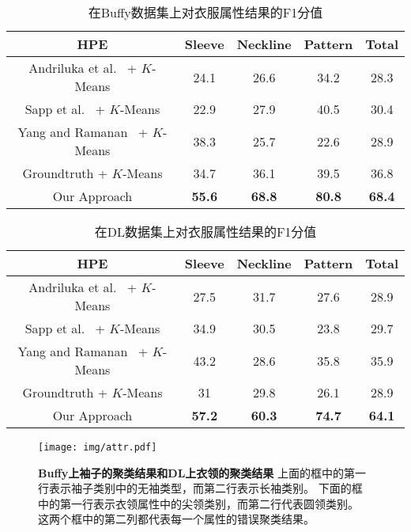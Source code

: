 \begin{table}
\centering
\caption{在Buffy数据集上对衣服属性结果的F1分值}
\begin{tabular}{|c|c|c|c|c|} \hline
    HPE & Sleeve & Neckline & Pattern & Total \\ \hline
Andriluka et al.~\cite{cvpr09} + $K$-Means & 24.1 & 26.6 & 34.2 & 28.3  \\ \hline
Sapp et al.~\cite{eccv10} + $K$-Means & 22.9 & 27.9 & 40.5 & 30.4 \\ \hline
Yang and Ramanan~\cite{deva11} + $K$-Means & 38.3 & 25.7 & 22.6 & 28.9\\ \hline
Groundtruth + $K$-Means & 34.7 & 36.1 & 39.5 & 36.8\\ \hline
Our Approach & \textbf{55.6} & \textbf{68.8} & \textbf{80.8} & \textbf{68.4}  \\ \hline
\end{tabular}
\label{tb:f1_buffy}
\end{table}


\begin{table}
\centering
\caption{在DL数据集上对衣服属性结果的F1分值}
\begin{tabular}{|c|c|c|c|c|} \hline
    HPE & Sleeve & Neckline & Pattern & Total \\ \hline
Andriluka et al.~\cite{cvpr09} + $K$-Means & 27.5 & 31.7 & 27.6 & 28.9  \\ \hline
Sapp et al.~\cite{eccv10} + $K$-Means & 34.9 & 30.5 & 23.8 & 29.7 \\ \hline
Yang and Ramanan~\cite{deva11} + $K$-Means & 43.2 & 28.6 & 35.8 & 35.9 \\ \hline
Groundtruth  + $K$-Means & 31 & 29.8 & 26.1 & 28.9 \\ \hline
Our Approach & \textbf{57.2} & \textbf{60.3} & \textbf{74.7} & \textbf{64.1}  \\ \hline
\end{tabular}
\label{tb:f1_dl}
\end{table}


\begin{figure*}[tbp]
\centering
\texttt{[image: img/attr.pdf]}
\caption{ \textbf{Buffy上袖子的聚类结果和DL上衣领的聚类结果}
上面的框中的第一行表示袖子类别中的无袖类型，而第二行表示长袖类别。
下面的框中的第一行表示衣领属性中的尖领类别，而第二行代表圆领类别。
这两个框中的第二列都代表每一个属性的错误聚类结果。
}
\label{fig:sleeve}
\end{figure*}


